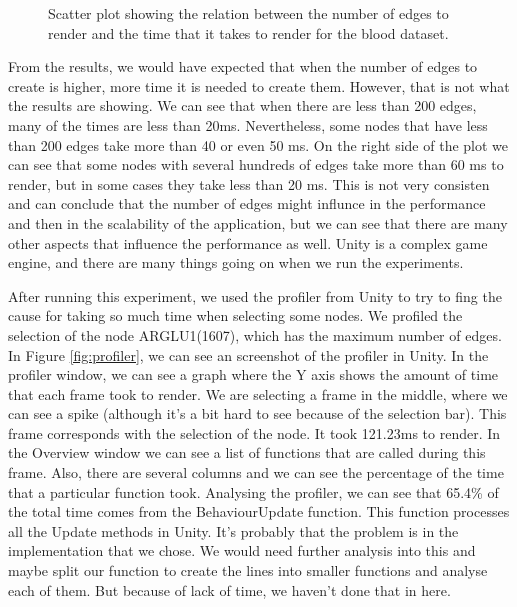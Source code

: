 \begin{figure}[h!]
  \centering
  \begin{minipage}{.8\textwidth}
  \end{minipage}
\caption{Scatter plot showing the relation between the number of edges to render and the time that it takes to render for the blood dataset.}
\label{fig:scalability_edges_blood}
\end{figure}

From the results, we would have expected that when the number of edges to create is higher, more time it is needed to create them. However, that is not what the results are showing. We can see that when there are less than 200 edges, many of the times are less than 20ms. Nevertheless, some nodes that have less than 200 edges take more than 40 or even 50 ms. On the right side of the plot we can see that some nodes with several hundreds of edges take more than 60 ms to render, but in some cases they take less than 20 ms. This is not very consisten and can conclude that the number of edges might influnce in the performance and then in the scalability of the application, but we can see that there are many other aspects that influence the performance as well. Unity is a complex game engine, and there are many things going on when we run the experiments.

After running this experiment, we used the profiler from Unity to try to fing the cause for taking so much time when selecting some nodes. We profiled the selection of the node ARGLU1(1607), which has the maximum number of edges. In Figure \ref{fig:profiler}, we can see an screenshot of the profiler in Unity. In the profiler window, we can see a graph where the Y axis shows the amount of time that each frame took to render. We are selecting a frame in the middle, where we can see a spike (although it's a bit hard to see because of the selection bar). This frame corresponds with the selection of the node. It took 121.23ms to render. In the Overview window we can see a list of functions that are called during this frame. Also, there are several columns and we can see the percentage of the time that a particular function took. Analysing the profiler, we can see that 65.4\% of the total time comes from the BehaviourUpdate function. This function processes all the Update methods in Unity. It's probably that the problem is in the implementation that we chose. We would need further analysis into this and maybe split our function to create the lines into smaller functions and analyse each of them. But because of lack of time, we haven't done that in here.

